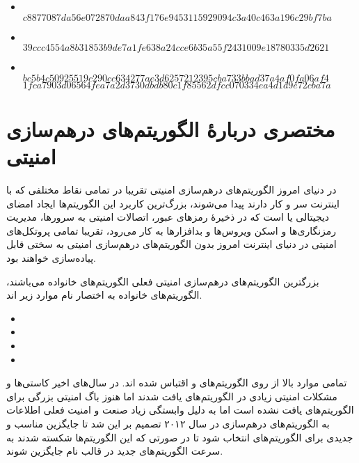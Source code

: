 	\begin{itemize}
	
	\item {}\\
$c8877087da56e072870daa843f176e9453115929094c3a40c463a196c29bf7ba$
\item {}\\
$39ccc4554a8b31853b9de7a1fe638a24cce6b35a55f2431009e18780335d2621$
\item {}\\
$bc5b4c50925519c290cc634277ae3d6257212395cba733bbad37a4af0fa06af4$\\
$1fca7903d06564fea7a2d3730dbdb80c1f85562dfcc070334ea4d1d9e72cba7a$

	\end{itemize}
	
\section{مختصری دربارهٔ الگوریتم‌های درهم‌سازی امنیتی}
در دنیای امروز الگوریتم‌های درهم‌سازی امنیتی تقریبا در تمامی نقاط مختلفی که با اینترنت سر و کار دارند پیدا می‌شوند، بزرگ‌ترین کاربرد این الگوریتم‌ها ایجاد امضای دیجیتالی یا 
است که در ذخیرهٔ رمزهای عبور، اتصالات امنیتی به سرورها، مدیریت رمزنگاری‌ها و اسکن ویروس‌ها و بدافزارها به کار می‌رود، تقریبا تمامی پروتکل‌های امنیتی در دنیای اینترنت امروز بدون الگوریتم‌های درهم‌سازی امنیتی به سختی قابل پیاده‌سازی خواهند بود. 
\par
بزرگترین الگوریتم‌های درهم‌سازی امنیتی فعلی الگوریتم‌های خانواده 
می‌باشند، الگوریتم‌های خانواده 
به اختصار نام موارد زیر اند.
\begin{itemize}
\item
	\item
	\item
	\item
\end{itemize}
تمامی موارد بالا از روی الگوریتم‌های 
 	و
اقتباس شده اند. 
در سال‌های اخیر کاستی‌ها و مشکلات امنیتی زیادی در الگوریتم‌های 
یافت شدند اما هنوز باگ امنیتی بزرگی برای الگوریتم‌های 
یافت نشده است اما به دلیل وابستگی زیاد صنعت و امنیت فعلی اطلاعات به الگوریتم‌های درهم‌سازی در سال ۲۰۱۲ 
تصمیم بر این شد تا جایگزین مناسب و جدیدی برای الگوریتم‌های 
انتخاب شود تا در صورتی که این الگوریتم‌ها شکسته شدند به سرعت الگوریتم‌های جدید در قالب نام 
جایگزین شوند. 
